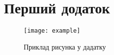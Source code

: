 \section{Перший додаток}

\begin{figure}[h]
  \centering
  \texttt{[image: example]}
  \caption{\label{img:layout}Приклад рисунка у дадатку}
\end{figure}

